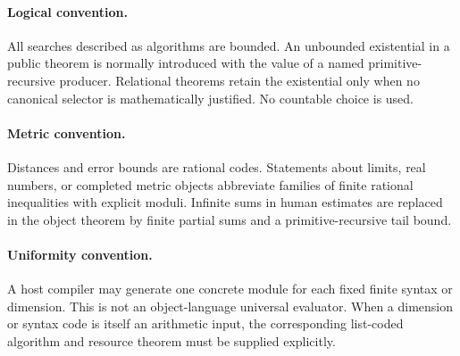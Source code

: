 \paragraph{Logical convention.}
All searches described as algorithms are bounded.  An unbounded existential in a public theorem is normally
introduced with the value of a named primitive-recursive producer.  Relational theorems retain the
existential only when no canonical selector is mathematically justified.  No countable choice is used.

\paragraph{Metric convention.}
Distances and error bounds are rational codes.  Statements about limits, real numbers, or completed metric
objects abbreviate families of finite rational inequalities with explicit moduli.  Infinite sums in human
estimates are replaced in the object theorem by finite partial sums and a primitive-recursive tail bound.

\paragraph{Uniformity convention.}
A host compiler may generate one concrete module for each fixed finite syntax or dimension.  This is not an
object-language universal evaluator.  When a dimension or syntax code is itself an arithmetic input, the
corresponding list-coded algorithm and resource theorem must be supplied explicitly.
